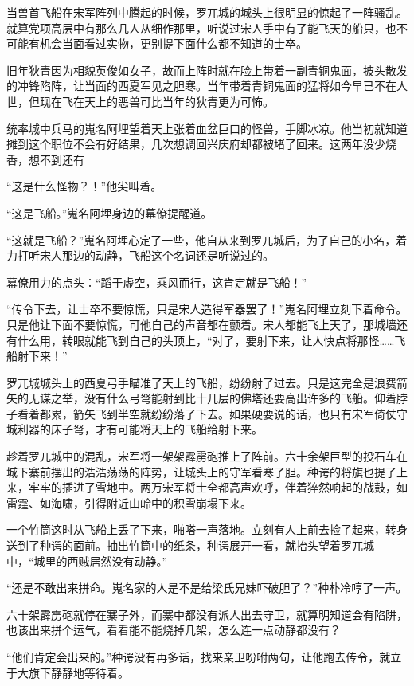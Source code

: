 当兽首飞船在宋军阵列中腾起的时候，罗兀城的城头上很明显的惊起了一阵骚乱。就算党项高层中有那么几人从细作那里，听说过宋人手中有了能飞天的船只，也不可能有机会当面看过实物，更别提下面什么都不知道的士卒。

旧年狄青因为相貌英俊如女子，故而上阵时就在脸上带着一副青铜鬼面，披头散发的冲锋陷阵，让当面的西夏军见之胆寒。当年带着青铜鬼面的猛将如今早已不在人世，但现在飞在天上的恶兽可比当年的狄青更为可怖。

统率城中兵马的嵬名阿埋望着天上张着血盆巨口的怪兽，手脚冰凉。他当初就知道摊到这个职位不会有好结果，几次想调回兴庆府却都被堵了回来。这两年没少烧香，想不到还有

“这是什么怪物？！”他尖叫着。

“这是飞船。”嵬名阿埋身边的幕僚提醒道。

“这就是飞船？”嵬名阿埋心定了一些，他自从来到罗兀城后，为了自己的小名，着力打听宋人那边的动静，飞船这个名词还是听说过的。

幕僚用力的点头：“蹈于虚空，乘风而行，这肯定就是飞船！”

“传令下去，让士卒不要惊慌，只是宋人造得军器罢了！”嵬名阿埋立刻下着命令。只是他让下面不要惊慌，可他自己的声音都在颤着。宋人都能飞上天了，那城墙还有什么用，转眼就能飞到自己的头顶上，“对了，要射下来，让人快点将那怪……飞船射下来！”

罗兀城城头上的西夏弓手瞄准了天上的飞船，纷纷射了过去。只是这完全是浪费箭矢的无谋之举，没有什么弓弩能射到比十几层的佛塔还要高出许多的飞船。仰着脖子看着都累，箭矢飞到半空就纷纷落了下去。如果硬要说的话，也只有宋军倚仗守城利器的床子弩，才有可能将天上的飞船给射下来。

趁着罗兀城中的混乱，宋军将一架架霹雳砲推上了阵前。六十余架巨型的投石车在城下寨前摆出的浩浩荡荡的阵势，让城头上的守军看寒了胆。种谔的将旗也提了上来，牢牢的插进了雪地中。两万宋军将士全都高声欢呼，伴着猝然响起的战鼓，如雷霆、如海啸，引得附近山岭中的积雪崩塌下来。

一个竹筒这时从飞船上丢了下来，啪嗒一声落地。立刻有人上前去捡了起来，转身送到了种谔的面前。抽出竹筒中的纸条，种谔展开一看，就抬头望着罗兀城中，“城里的西贼居然没有动静。”

“还是不敢出来拼命。嵬名家的人是不是给梁氏兄妹吓破胆了？”种朴冷哼了一声。

六十架霹雳砲就停在寨子外，而寨中都没有派人出去守卫，就算明知道会有陷阱，也该出来拼个运气，看看能不能烧掉几架，怎么连一点动静都没有？

“他们肯定会出来的。”种谔没有再多话，找来亲卫吩咐两句，让他跑去传令，就立于大旗下静静地等待着。

